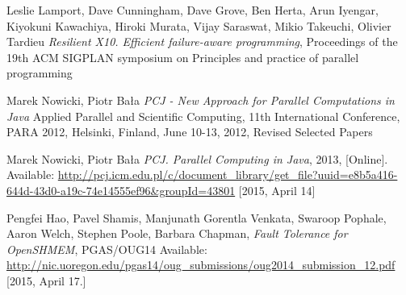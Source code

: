 \documentclass{llncs}
\begin{document}
\begin{thebibliography}{1}

Leslie Lamport, Dave Cunningham, Dave Grove, Ben Herta, Arun Iyengar, Kiyokuni Kawachiya, Hiroki Murata, Vijay Saraswat, Mikio Takeuchi, Olivier Tardieu
\emph{Resilient X10. Efficient failure-aware programming},
Proceedings of the 19th ACM SIGPLAN symposium on Principles and practice of parallel programming

Marek Nowicki, Piotr Bała
\emph{PCJ - New Approach for Parallel Computations in Java}
Applied Parallel and Scientific Computing, 11th International Conference, PARA 2012, Helsinki, Finland, June 10-13, 2012, Revised Selected Papers

Marek Nowicki, Piotr Bała
\emph{PCJ. Parallel Computing in Java}, 2013, [Online]. Available: \url{http://pcj.icm.edu.pl/c/document_library/get_file?uuid=e8b5a416-644d-43d0-a19c-74e14555ef96&groupId=43801} [2015, April 14]

Pengfei Hao, Pavel Shamis, Manjunath Gorentla Venkata, Swaroop Pophale, Aaron Welch, Stephen Poole, Barbara Chapman, \emph{Fault Tolerance for OpenSHMEM}, PGAS/OUG14
Available: \url{http://nic.uoregon.edu/pgas14/oug_submissions/oug2014_submission_12.pdf} [2015, April 17.]

\end{thebibliography}
\end{document}
